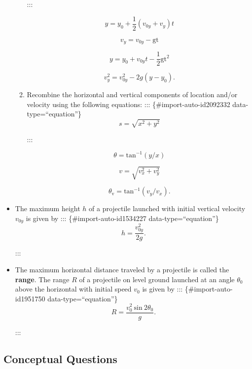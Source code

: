 \documentclass[
]{book}
\begin{document}
\begin{itemize}
\begin{enumerate}
    :::

    \leavevmode{}%
    \[{{y = {y_{0} + \frac{1}{2}}}({v_{0y} + v_{y}})t}{}\]

    \leavevmode{}%
    \[{v_{y} = {v_{0y} - \text{gt}}}{}\]

    \leavevmode{}%
    \[{{y = {y_{0} + v_{0y}}}{t - \frac{1}{2}}\text{gt}^{2}}{}\]

    \leavevmode{}%
    \[{{v_{y}^{2} = {v_{0y}^{2} - 2g}}({y - y_{0}})}.{}\]
  \item
    \protect\hypertarget{import-auto-id1552181}{}{Recombine the horizontal and vertical components of location
    and/or velocity using the following
    equations:}
    ::: \{\#import-auto-id2092332 data-type=``equation''\}
    \[{s = \sqrt{x^{2} + y^{2}}}{}\]

    :::

    \leavevmode{}%
    \[{{\theta = \text{tan}^{- 1}}({y/x})}{}\]

    \leavevmode{}%
    \[{v = \sqrt{v_{x}^{2} + v_{y}^{2}}}{}\]

    \leavevmode{}%
    \[{{\theta_{\text{v}} = \text{tan}^{- 1}}({v_{y}/v_{x}})}{}.\]
  \end{enumerate}
\item
  \protect\hypertarget{import-auto-id1888635}{}{The maximum height \(h{}\) of a projectile launched with initial
  vertical velocity \(v_{0y}{}\) is given by}
  ::: \{\#import-auto-id1534227 data-type=``equation''\}
  \[{h = \frac{v_{0y}^{2}}{2g}}{}.\]

  :::
\item
  \protect\hypertarget{import-auto-id1823593}{}{The maximum horizontal distance traveled by a projectile is called
  the \textbf{range}. The range \(R{}\) of a projectile on level ground
  launched at an angle \(\theta_{0}{}\) above the horizontal with
  initial speed \(v_{0}{}\) is given by}
  ::: \{\#import-auto-id1951750 data-type=``equation''\}
  \[{R = \frac{v_{0}^{2}\ \text{sin}\ {2\theta}_{0}}{g}}{}.\]

  :::
\end{itemize}

\hypertarget{fs-id2865659}{}
\hypertarget{conceptual-questions-9}{%
\subsection{Conceptual Questions}\label{conceptual-questions-9}}
\end{document}
